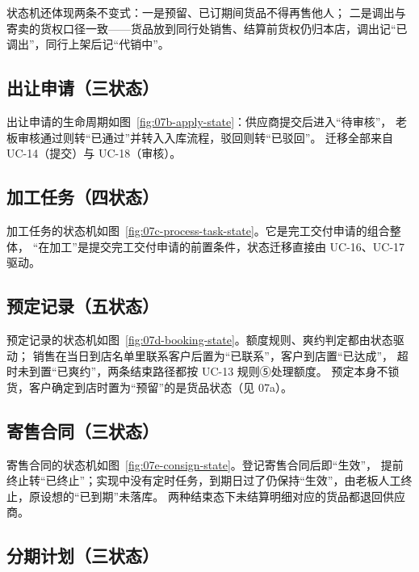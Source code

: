 状态机还体现两条不变式：一是预留、已订期间货品不得再售他人；
二是调出与寄卖的货权口径一致——货品放到同行处销售、结算前货权仍归本店，调出记“已调出”，同行上架后记“代销中”。

\subsection{出让申请（三状态）}

出让申请的生命周期如图~\ref{fig:07b-apply-state}：供应商提交后进入“待审核”，
老板审核通过则转“已通过”并转入入库流程，驳回则转“已驳回”。
迁移全部来自 UC-14（提交）与 UC-18（审核）。


\subsection{加工任务（四状态）}

加工任务的状态机如图~\ref{fig:07c-process-task-state}。它是完工交付申请的组合整体，
“在加工”是提交完工交付申请的前置条件，状态迁移直接由 UC-16、UC-17 驱动。


\subsection{预定记录（五状态）}

预定记录的状态机如图~\ref{fig:07d-booking-state}。额度规则、爽约判定都由状态驱动；
销售在当日到店名单里联系客户后置为“已联系”，客户到店置“已达成”，
超时未到置“已爽约”，两条结束路径都按 UC-13 规则⑤处理额度。
预定本身不锁货，客户确定到店时置为“预留”的是货品状态（见 07a）。


\subsection{寄售合同（三状态）}

寄售合同的状态机如图~\ref{fig:07e-consign-state}。登记寄售合同后即“生效”，
提前终止转“已终止”；实现中没有定时任务，到期日过了仍保持“生效”，由老板人工终止，原设想的“已到期”未落库。
两种结束态下未结算明细对应的货品都退回供应商。


\subsection{分期计划（三状态）}

